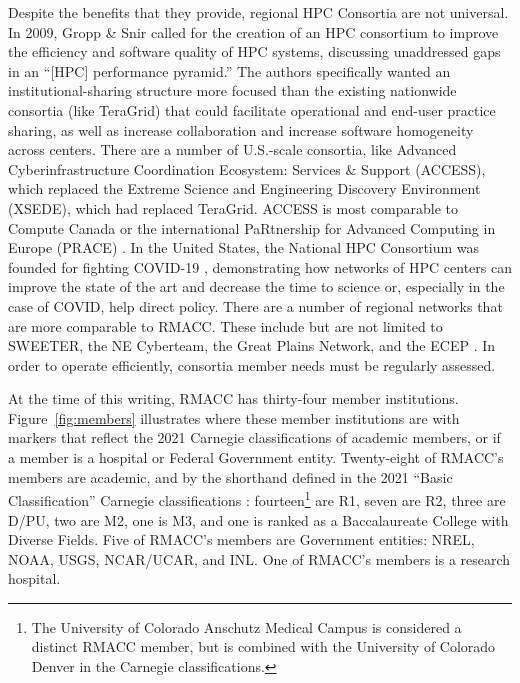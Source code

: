 \documentclass[sigconf]{acmart}
\theoremstyle{plain}
\begin{document}
Despite the benefits that they provide, regional HPC Consortia are not
universal.  In 2009, Gropp \& Snir
\cite{IJHPCA_GrSn09:Call:HPC:Consortia} called for the creation of an
HPC consortium to improve the efficiency and software quality of HPC
systems, discussing unaddressed gaps in an ``[HPC] performance
pyramid.'' The authors specifically wanted an institutional-sharing
structure more focused than the existing nationwide consortia (like
TeraGrid) that could facilitate operational and end-user practice
sharing, as well as increase collaboration and increase software
homogeneity across centers.  There are a number of U.S.-scale consortia,
like Advanced Cyberinfrastructure Coordination Ecosystem: Services \&
Support (ACCESS), which replaced the Extreme Science and Engineering
Discovery Environment (XSEDE), which had replaced TeraGrid. ACCESS is
most comparable to Compute Canada or the international PaRtnership for
Advanced Computing in Europe (PRACE) \cite{JPCS12_Bal:ComputeCanada}.
In the United States, the National HPC Consortium was founded for
fighting COVID-19
\cite{CSE_HaPa20:HPCConsortium:COVID,CSE_BraseEtAl22:HPCConsortium:COVID},
demonstrating how networks of HPC centers can improve the state of the
art and decrease the time to science or, especially in the case of
COVID, help direct policy. There are a number of regional networks that
are more comparable to RMACC. These include but are not limited to
SWEETER, the NE Cyberteam, the Great Plains Network, and the ECEP
\cite{%
  SWEETER:web,SWEETER,
  NECyberteam:web,NECyberteam:A,NECyberteam:B,JCSE:NECyberteam:C,
  GPN:web,GPN06,
  ECEP:web,ECEP12%
}. In order to operate efficiently, consortia member needs must be
regularly assessed.

At the time of this writing, RMACC has thirty-four member institutions.
Figure~\ref{fig:members} illustrates where these member institutions are
with markers that reflect the 2021 Carnegie classifications
\cite{carnegie21:web} of academic members, or if a member is a hospital
or Federal Government entity. Twenty-eight of RMACC's members are
academic, and by the shorthand defined in the 2021 ``Basic
Classification'' Carnegie classifications
\cite{carnegieclassifications:basic:web}:
fourteen\footnote{%
The University of Colorado Anschutz Medical Campus is considered a
distinct RMACC member, but is combined with the University of Colorado
Denver in the Carnegie classifications.
} are R1, seven are R2, three are D/PU, two are M2, one is M3, and one
is ranked as a Baccalaureate College with Diverse Fields.  Five of
RMACC's members are Government entities:
NREL, NOAA, USGS, NCAR/UCAR, and INL. 
One of RMACC's members is a research hospital. 
\end{document}
